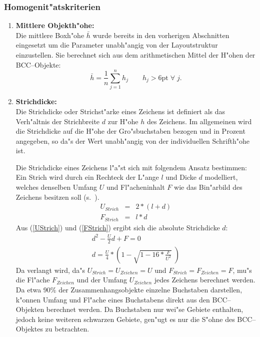 \subsubsection{Homogenit"atskriterien}\label{Homogenitaet}
\begin{enumerate}

  \item{\bf Mittlere Objekth"ohe:}\\
  Die mittlere Boxh"ohe $\bar{h}$ wurde bereits in den vorherigen Abschnitten eingesetzt
  um die Parameter
  unabh"angig von der Layoutstruktur einzustellen. Sie berechnet sich aus dem arithmetischen
  Mittel der H"ohen der BCC--Objekte:
  $$\bar{h} = \frac{1}{n} \sum_{j=1}^n h_j \qquad h_j > 6\mbox{pt} \;\forall\; j.$$

  \item{\bf Strichdicke:}\\
  Die Strichdicke oder Strichst"arke eines Zeichens ist definiert als das Verh"altnis der
  Strichbreite $d$ zur H"ohe $h$ des Zeichens. Im allgemeinen wird die Strichdicke auf die H"ohe
  der Gro"sbuchstaben bezogen und in Prozent angegeben, so da"s der Wert unabh"angig von der
  individuellen Schrifth"ohe ist.

  Die Strichdicke eines Zeichens l"a"st sich mit folgendem Ansatz bestimmen:
  Ein Strich wird durch ein Rechteck der L"ange $l$ und Dicke $d$ modelliert,
  welches denselben Umfang $U$ und Fl"acheninhalt $F$ wie das Bin"arbild des Zeichens besitzen soll
  (s.\ \cite{Kuropka90}).
  \begin{eqnarray}
    U_{Strich} &=& 2 * ( l + d)\label{UStrich}\\
    F_{Strich} &=& l * d\label{FStrich}
  \end{eqnarray}
  Aus (\ref{UStrich}) und (\ref{FStrich}) ergibt sich die absolute Strichdicke $d$:
  \begin{eqnarray}
    d^2 - \frac{U}{2}d + F = 0\nonumber\\
    d = \frac{U}{4} * \left( 1 - \sqrt{ 1-16*\frac{F}{U^2} } \;\right)\label{Strich}
  \end{eqnarray}
  Da verlangt wird, da"s $U_{Strich} = U_{Zeichen} = U$ und $F_{Strich} = F_{Zeichen} = F$, mu"s
  die Fl"ache $F_{Zeichen}$ und der Umfang $U_{Zeichen}$ jedes Zeichens berechnet werden.
  Da etwa 90\% der Zusammenhangsobjekte einzelne Buchstaben darstellen, k"onnen
  Umfang und Fl"ache eines Buchstabens direkt aus den BCC--Objekten berechnet werden.
  Da Buchstaben nur wei"se Gebiete enthalten, jedoch keine weiteren schwarzen Gebiete,
  gen"ugt es nur die S"ohne des BCC--Objektes zu betrachten.


\end{enumerate}
